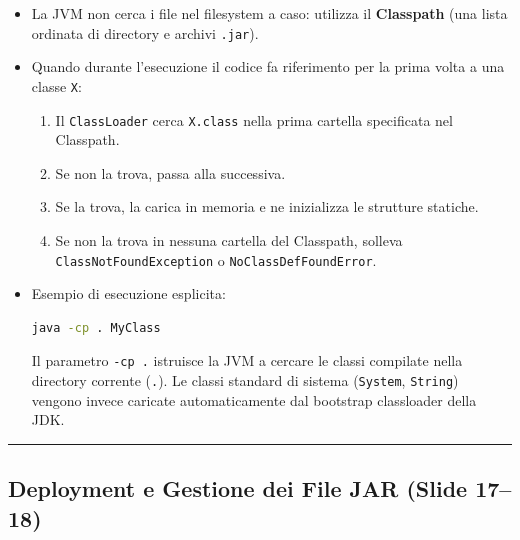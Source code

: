 \documentclass[11pt,a4paper,oneside]{report}
\newcommand{\passthrough}[1]{#1}
\providecommand{\tightlist}{\setlength{\itemsep}{0pt}\setlength{\parskip}{0pt}}
\begin{document}
\begin{enumerate}
  \begin{itemize}
  \item
    La JVM non cerca i file nel filesystem a caso: utilizza il
    \textbf{Classpath} (una lista ordinata di directory e archivi
    \passthrough{\lstinline!.jar!}).
  \item
    Quando durante l'esecuzione il codice fa riferimento per la prima
    volta a una classe \passthrough{\lstinline!X!}:

    \begin{enumerate}
    \def\labelenumii{\arabic{enumii}.}
    \tightlist
    \item
      Il \passthrough{\lstinline!ClassLoader!} cerca
      \passthrough{\lstinline!X.class!} nella prima cartella specificata
      nel Classpath.
    \item
      Se non la trova, passa alla successiva.
    \item
      Se la trova, la carica in memoria e ne inizializza le strutture
      statiche.
    \item
      Se non la trova in nessuna cartella del Classpath, solleva
      \passthrough{\lstinline!ClassNotFoundException!} o
      \passthrough{\lstinline!NoClassDefFoundError!}.
    \end{enumerate}
  \item
    Esempio di esecuzione esplicita:

\begin{lstlisting}[language=bash]
java -cp . MyClass
\end{lstlisting}

    Il parametro \passthrough{\lstinline!-cp .!} istruisce la JVM a
    cercare le classi compilate nella directory corrente
    (\passthrough{\lstinline!.!}). Le classi standard di sistema
    (\passthrough{\lstinline!System!}, \passthrough{\lstinline!String!})
    vengono invece caricate automaticamente dal bootstrap classloader
    della JDK.
  \end{itemize}
\end{enumerate}

\begin{center}\rule{0.5\linewidth}{0.5pt}\end{center}

\subsection{Deployment e Gestione dei File JAR (Slide
17--18)}\label{chap03_deployment-e-gestione-dei-file-jar-slide-1718}
\end{document}
